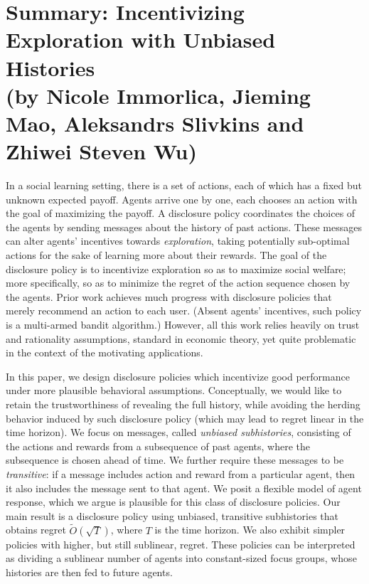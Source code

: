 \documentclass[11pt,letterpaper]{article}
\begin{document}

\section*{Summary: Incentivizing Exploration with Unbiased Histories
\\{\large (by Nicole Immorlica, Jieming Mao, Aleksandrs Slivkins and Zhiwei Steven Wu)}}


In a social learning setting, there is a set of actions, each of which has a fixed but unknown expected payoff. Agents arrive one by one, each chooses an action with the goal of maximizing the payoff.  A disclosure policy coordinates the choices of the agents by sending messages about the history of past actions. These messages can alter agents' incentives towards \emph{exploration}, taking potentially sub-optimal actions for the sake of learning more about their rewards. The goal of the disclosure policy is to incentivize exploration so as  to maximize social welfare; more specifically, so as to minimize the regret of the action sequence chosen by the agents. Prior work achieves much progress with disclosure policies that merely recommend an action to each user. (Absent agents' incentives, such policy is a multi-armed bandit algorithm.) However, all this work relies heavily on trust and rationality assumptions, standard in economic theory, yet quite problematic in the context of the motivating applications.

In this paper, we design disclosure policies which incentivize good performance under more plausible behavioral assumptions. Conceptually, we would like to retain the trustworthiness of revealing the full history, while avoiding the herding behavior induced by such disclosure policy (which may lead to regret linear in the time horizon). We focus on messages, called {\em unbiased subhistories}, consisting of the actions and rewards from a subsequence of past agents, where the subsequence is chosen ahead of time. We further require these messages to be \emph{transitive}: if a message includes action and reward from a particular agent, then it also includes the message sent to that agent. We posit a flexible model of agent response, which we argue is plausible for this class of disclosure policies. Our main result is a disclosure policy using unbiased, transitive subhistories that obtains regret $\tilde{O}(\sqrt{T})$, where $T$ is the time horizon.  We also exhibit simpler policies with higher, but still sublinear, regret.  These policies can be interpreted as dividing a sublinear number of agents into constant-sized focus groups, whose histories are then fed to future agents.
\end{document}
